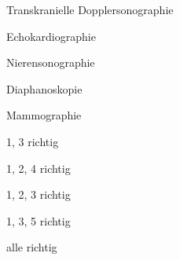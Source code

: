 \begin{minipage}{.7\linewidth}
  \begin{benumerate}
    \item Transkranielle Dopplersonographie
    \item Echokardiographie
    \item Nierensonographie
    \item Diaphanoskopie
    \item Mammographie
  \end{benumerate}
\end{minipage}%
\begin{minipage}{.25\linewidth}
  \begin{checklist}[leftmargin=7mm]
    \item 1, 3 richtig
    \item 1, 2, 4 richtig
    \item[\checkedbox] 1, 2, 3 richtig
    \item 1, 3, 5 richtig
    \item alle richtig
  \end{checklist}
\end{minipage}